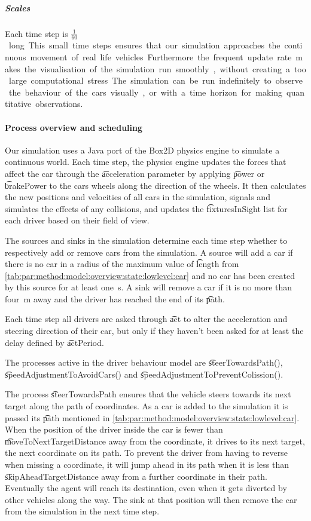 \subparagraph{Scales}
Each time step is \si{$\frac{1}{60}$ \second} long. This small time steps ensures that our simulation approaches the continuous movement of real life vehicles. Furthermore the frequent update rate makes the visualisation of the simulation run smoothly, without creating a too large computational stress.

The simulation can be run indefinitely to observe the behaviour of the cars visually, or with a time horizon for making quantitative observations.

\paragraph{Process overview and scheduling}
\label{par:method:model:overview:process}
Our simulation uses a Java port of the Box2D physics engine to simulate a continuous world. Each time step, the physics engine updates the forces that affect the car through the \t{acceleration} parameter by applying \t{power} or \t{brakePower} to the cars wheels along the direction of the wheels. It then calculates the new positions and velocities of all cars in the simulation, signals and simulates the effects of any collisions, and updates the \t{fixturesInSight} list for each driver based on their field of view.

The sources and sinks in the simulation determine each time step whether to respectively add or remove cars from the simulation. A source will add a car if there is no car in a radius of the maximum value of \t{length} from \cref{tab:par:method:model:overview:state:lowlevel:car} and no car has been created by this source for at least \si{one \second}. A sink will remove a car if it is no more than \si{four \meter} away and the driver has reached the end of its \t{path}.

Each time step all drivers are asked through \t{act} to alter the acceleration and steering direction of their car, but only if they haven't been asked for at least the delay defined by \t{actPeriod}.

The processes active in the driver behaviour model are \t{steerTowardsPath()}, \t{speedAdjustmentToAvoidCars()} and \t{speedAdjustmentToPreventColission()}.

The process \t{steerTowardsPath} ensures that the vehicle steers towards its next target along the path of coordinates. As a car is added to the simulation it is passed its \t{path} mentioned in \cref{tab:par:method:model:overview:state:lowlevel:car}. When the position of the driver inside the car is fewer than \t{moveToNextTargetDistance} away from the coordinate, it drives to its next target, the next coordinate on its path. To prevent the driver from having to reverse when missing a coordinate, it will jump ahead in its path when it is less than \t{skipAheadTargetDistance} away from a further coordinate in their path. Eventually the agent will reach its destination, even when it gets diverted by other vehicles along the way. The sink at that position will then remove the car from the simulation in the next time step.

